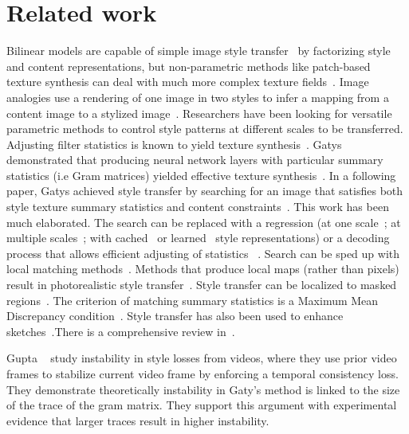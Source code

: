\documentclass[runningheads]{llncs}
\begin{document}
\section{Related work} \label{sec:gatys}
Bilinear models are capable of simple image style transfer~\cite{Tenenbaum2000} by factorizing style and content representations, but non-parametric methods like patch-based texture synthesis can deal with much more complex texture fields~\cite{Efros2001}.  Image analogies
use a rendering of one image in two styles to infer a mapping from a content image to a stylized
image~\cite{Hertzmann2001}. Researchers have been looking for versatile parametric methods to control style patterns at
different scales to be transferred. Adjusting filter statistics is known to yield texture
synthesis~\cite{debonet,simoncelli}.  Gatys \ea demonstrated that producing neural network layers with particular
summary statistics (i.e Gram matrices) yielded effective texture synthesis~\cite{NIPS2015_5633}. In a following paper,
Gatys \ea achieved style transfer by searching for an image that satisfies both style texture summary statistics and
content constraints~\cite{gatys2016image}. This work has been much elaborated. The search can be replaced with a
regression (at one scale~\cite{Johnson2016Perceptual}; at multiple scales~\cite{wang2016multimodal}; with
cached~\cite{chen2017stylebank} or learned~\cite{dumoulin2016learned} style representations) or a decoding process that
allows efficient adjusting of statistics ~\cite{DBLP:journals/corr/UlyanovVL16,huang2017arbitrary,UST,li2018closed}. Search can be sped up with local matching
methods~\cite{chen2016fast}. Methods that produce local maps (rather than pixels) result in photorealistic style
transfer~\cite{Shih2014,Luan2017}. Style transfer can be localized to masked regions~\cite{gatys2016controlling}. The
criterion of matching summary statistics is a Maximum Mean Discrepancy condition~\cite{li2017demystifying}. Style
transfer has also been used to enhance sketches~\cite{champandard2016semantic}.There is a comprehensive review in~\cite{jing2017neural}.

Gupta \ea ~\cite{gupta2017characterizing} study instability in style losses from videos, 
where they use prior video frames to stabilize current video frame by enforcing a temporal consistency loss. They demonstrate theoretically
instability in Gaty's method is linked to the size of the trace of the gram matrix. They support this argument with experimental evidence
that larger traces result in higher instability.
\end{document}

